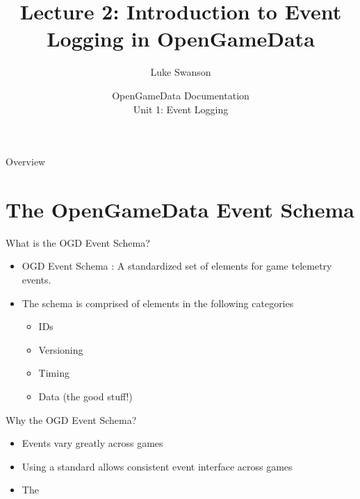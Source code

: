 \documentclass{beamer}
\title[Intro to Events] %
{Lecture 2: Introduction to Event Logging in OpenGameData}
\author[Swanson] %
{Luke Swanson}
\institute[University of Wisconsin-Madison] %
{
  Field Day Lab\\
  University of Wisconsin-Madison
}
\date[OGD Docs] %
{OpenGameData Documentation \\ Unit 1: Event Logging}
\begin{document}
\begin{frame}
  \titlepage
\end{frame}

\begin{frame}{Overview}
  \tableofcontents
\end{frame}




\section[Event Schema]{The OpenGameData Event Schema}

\begin{frame}{What is the OGD Event Schema?}
  \begin{itemize}
    \item \alert{OGD Event Schema :} A standardized set of elements for game telemetry events.
    \item The schema is comprised of elements in the following categories
    \begin{itemize}
      \item IDs
      \item Versioning
      \item Timing
      \item Data (the good stuff!)
    \end{itemize}
  \end{itemize}
\end{frame}

\begin{frame}{Why the OGD Event Schema?}
  \begin{itemize}
  \item Events vary greatly across games
  \item Using a standard allows consistent event interface across games
  \item The  
  \end{itemize}
\end{frame}
\end{document}
